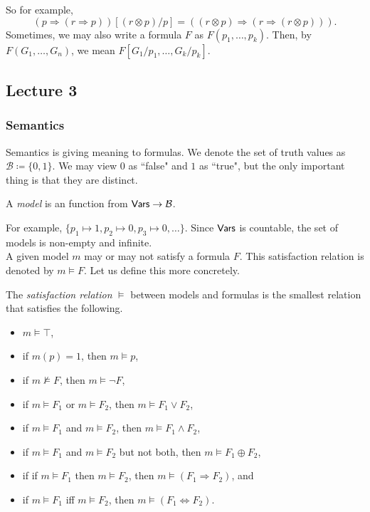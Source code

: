 So for example,
\[ (p\Rightarrow (r\Rightarrow p))[(r\otimes p)/p] = ((r\otimes p)\Rightarrow (r\Rightarrow (r\otimes p))). \]
Sometimes, we may also write a formula $F$ as $F(p_1,\ldots,p_k)$. Then, by $F(G_1,\ldots,G_n)$, we mean $F[G_1/p_1,\ldots,G_k/p_k]$.

\subsection{Lecture 3}

\subsubsection{Semantics}

Semantics is giving meaning to formulas. We denote the set of truth values as $\mathcal{B}\coloneqq\{0,1\}$. We may view $0$ as ``false" and $1$ as ``true", but the only important thing is that they are distinct.

\begin{definition}[Model]
A \textit{model} is an function from $\mathsf{Vars}\to\mathcal{B}$.
\end{definition}

For example, $\{p_1\mapsto 1, p_2\mapsto 0, p_3\mapsto 0,\ldots\}$. Since $\mathsf{Vars}$ is countable, the set of models is non-empty and infinite.\\
A given model $m$ may or may not satisfy a formula $F$. This satisfaction relation is denoted by $m\vDash F$. Let us define this more concretely.

\begin{definition}
The \textit{satisfaction relation} $\vDash$ between models and formulas is the smallest relation that satisfies the following.
\begin{itemize}
    \item $m\vDash\top$,
    \item if $m(p)=1$, then $m\vDash p$,
    \item if $m\nvDash F$, then $m\vDash\neg F$,
    \item if $m\vDash F_1$ or $m\vDash F_2$, then $m\vDash F_1\vee F_2$,
    \item if $m\vDash F_1$ and $m\vDash F_2$, then $m\vDash F_1\wedge F_2$,
    \item if $m\vDash F_1$ and $m\vDash F_2$ but not both, then $m\vDash F_1\oplus F_2$,
    \item if if $m\vDash F_1$ then $m\vDash F_2$, then $m\vDash (F_1\Rightarrow F_2)$, and
    \item if $m\vDash F_1$ iff $m\vDash F_2$, then $m\vDash (F_1\iff F_2)$.
\end{itemize}
\end{definition}

